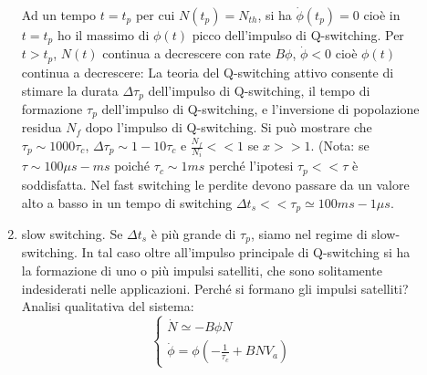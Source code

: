 \documentclass{book}
\def \D {\Delta}
\theoremstyle{remark}
\begin{document}
\begin{description}
\begin{enumerate}
Ad un tempo $t = t_p$ per cui $N(t_p) = N_{th}$, si ha $\dot{\phi}(t_p) = 0$ cioè in $t=t_p$ ho il massimo di $\phi(t)$ picco dell'impulso di Q-switching. Per $t > t_p$, $N(t)$ continua a decrescere con rate $B\phi$, $\dot{\phi}<0$ cioè $\phi(t)$ continua a decrescere:
La teoria del Q-switching attivo consente di stimare la durata $\D \tau_p$ dell'impulso di Q-switching, il tempo di formazione $\tau_p$ dell'impulso di Q-switching, e l'inversione di popolazione residua $N_f$ dopo l'impulso di Q-switching. Si può mostrare che $\tau_p \sim 1000 \tau_c$, $\D\tau_p \sim 1-10\tau_c$ e $\frac{N_f}{N_i}<<1$ se $x>>1$. (Nota: se $\tau \sim 100 \mu s - ms$ poiché $\tau_c \sim 1ms$ perché l'ipotesi $\tau_p << \tau$ è soddisfatta. Nel fast switching le perdite devono passare da un valore alto a basso in un tempo di switching $\D t_s << \tau_p \simeq 100 ms - 1 \mu s$.
\item slow switching. Se $\D t_s$ è più grande di $\tau_p$, siamo nel regime di slow-switching. In tal caso oltre all'impulso principale di Q-switching si ha la formazione di uno o più impulsi satelliti, che sono solitamente indesiderati nelle applicazioni. Perché si formano gli impulsi satelliti? Analisi qualitativa del sistema:
\begin{equation*}
\begin{cases}
\dot{N} \simeq - B\phi N\\
\dot{\phi} = \phi(-\frac{1}{\tau_c} + BN V_a)
\end{cases}
\end{equation*}
\end{enumerate}
\end{description}
\end{document}
